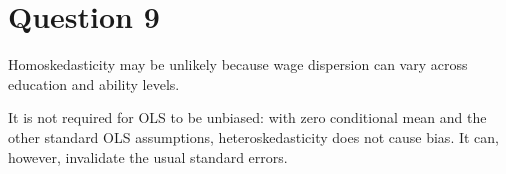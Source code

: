 \section*{Question 9}
Homoskedasticity may be unlikely because wage dispersion can vary across
education and ability levels.

It is not required for OLS to be unbiased: with zero conditional mean and
the other standard OLS assumptions, heteroskedasticity does not cause bias.
It can, however, invalidate the usual standard errors.
